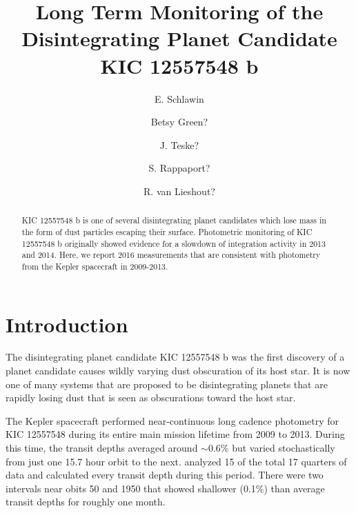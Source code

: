 \documentclass[twocolumn]{aastex61}
\begin{document}
\title{Long Term Monitoring of the Disintegrating Planet Candidate KIC 12557548 b}



\author{E. Schlawin}

\author{Betsy Green?}

\author{J. Teske?}

\author{S. Rappaport?}

\author{R. van Lieshout?}

\begin{abstract}
KIC 12557548 b is one of several disintegrating planet candidates which lose mass in the form of dust particles escaping their surface. Photometric monitoring of KIC 12557548 b originally showed evidence for a slowdown of integration activity in 2013 and 2014. Here, we report 2016 measurements that are consistent with photometry from the Kepler spacecraft in 2009-2013.
\end{abstract}





\section{Introduction}
The disintegrating planet candidate KIC 12557548 b \citep{rappaport} was the first discovery of a planet candidate causes wildly varying dust obscuration of its host star.
It is now one of many systems that are proposed to be disintegrating planets that are rapidly losing dust that is seen as obscurations toward the host star.

The Kepler spacecraft performed near-continuous long cadence photometry for KIC 12557548 during its entire main mission lifetime from 2009 to 2013.
During this time, the transit depths averaged around $\sim$0.6\% but varied stochastically from just one 15.7 hour orbit to the next.
\citet{vanWerkhoven2014} analyzed 15 of the total 17 quarters of data and calculated every transit depth during this period.
There were two intervals near obits 50 and 1950 that showed shallower (0.1\%) than average transit depths for roughly one month.
\end{document}

